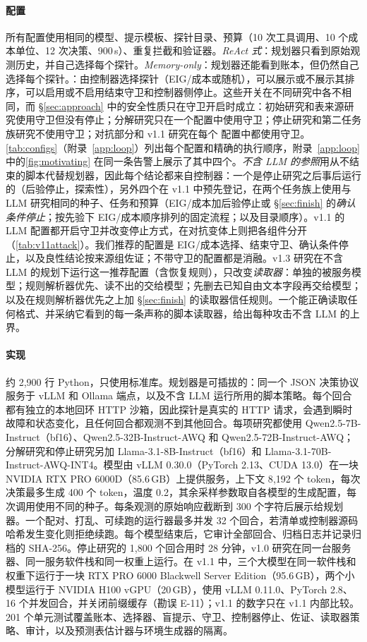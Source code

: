\paragraph{配置} 所有配置使用相同的模型、提示模板、探针目录、预算（10 次工具调用、10 个成本单位、12 次决策、900\,s）、重复拦截和验证器。\emph{ReAct 式}：规划器只看到原始观测历史，并自己选择每个探针。\emph{Memory-only}：规划器还能看到账本，但仍然自己选择每个探针。\emph{\hesp{}}：由控制器选择探针（EIG/成本或随机），可以展示或不展示其排序，可以启用或不启用结束守卫和控制器侧停止。这些开关在不同研究中各不相同，而 \S\ref{sec:approach} 中的安全性质只在守卫开启时成立：初始研究和表来源研究使用守卫但没有停止；分解研究只在一个配置中使用守卫；停止研究和第二任务族研究不使用守卫；对抗部分和 v1.1 研究在每个 \hesp{} 配置中都使用守卫。\cref{tab:configs}（附录~\ref{app:loop}）列出每个配置和精确的执行顺序，附录~\ref{app:loop} 中的\cref{fig:motivating} 在同一条告警上展示了其中四个。\emph{不含 LLM 的参照}用从不结束的脚本代替规划器，因此每个结论都来自控制器：一个是停止研究之后事后运行的（后验停止，探索性），另外四个在 v1.1 中预先登记，在两个任务族上使用与 LLM 研究相同的种子、任务和预算（EIG/成本加后验停止或 \S\ref{sec:finish} 的\emph{确认条件停止}；按先验下 EIG/成本顺序排列的固定流程；以及目录顺序）。v1.1 的 LLM 配置都开启守卫并改变停止方式，在对抗变体上则把各组件分开（\cref{tab:v11attack}）。我们推荐的配置是 EIG/成本选择、结束守卫、确认条件停止，以及良性结论按来源组佐证；不带守卫的配置都是消融。v1.3 研究在不含 LLM 的规划下运行这一推荐配置（含恢复规则），只改变\emph{读取器}：单独的被服务模型；规则解析器优先、读不出的交给模型；先删去已知自由文本字段再交给模型；以及在规则解析器优先之上加 \S\ref{sec:finish} 的读取器信任规则。一个能正确读取任何格式、并采纳它看到的每一条声称的脚本读取器，给出每种攻击不含 LLM 的上界。

\paragraph{实现} \hesp{} 约 2{,}900 行 Python，只使用标准库。规划器是可插拔的：同一个 JSON 决策协议服务于 vLLM 和 Ollama 端点，以及不含 LLM 运行所用的脚本策略。每个回合都有独立的本地回环 HTTP 沙箱，因此探针是真实的 HTTP 请求，会遇到瞬时故障和状态变化，且任何回合都观测不到其他回合。每项研究都使用 Qwen2.5-7B-Instruct（bf16）、Qwen2.5-32B-Instruct-AWQ 和 Qwen2.5-72B-Instruct-AWQ；分解研究和停止研究另加 Llama-3.1-8B-Instruct（bf16）和 Llama-3.1-70B-Instruct-AWQ-INT4。模型由 vLLM 0.30.0（PyTorch 2.13、CUDA 13.0）在一块 NVIDIA RTX PRO 6000D（85.6\,GB）上提供服务，上下文 8{,}192 个 token，每次决策最多生成 400 个 token，温度 0.2，其余采样参数取自各模型的生成配置，每次调用使用不同的种子。每条观测的原始响应截断到 300 个字符后展示给规划器。一个配对、打乱、可续跑的运行器最多并发 32 个回合，若清单或控制器源码哈希发生变化则拒绝续跑。每个模型结束后，它审计全部回合、归档日志并记录归档的 SHA-256。停止研究的 1{,}800 个回合用时 28 分钟，v1.0 研究在同一台服务器、同一服务软件栈和同一权重上运行。在 v1.1 中，三个大模型在同一软件栈和权重下运行于一块 RTX PRO 6000 Blackwell Server Edition（95.6\,GB），两个小模型运行于 NVIDIA H100 vGPU（20\,GB），使用 vLLM 0.11.0、PyTorch 2.8、16 个并发回合，并关闭前缀缓存（勘误 E-11）；v1.1 的数字只在 v1.1 内部比较。201 个单元测试覆盖账本、选择器、盲提示、守卫、控制器停止、佐证、读取器策略、审计，以及预测表估计器与环境生成器的隔离。

